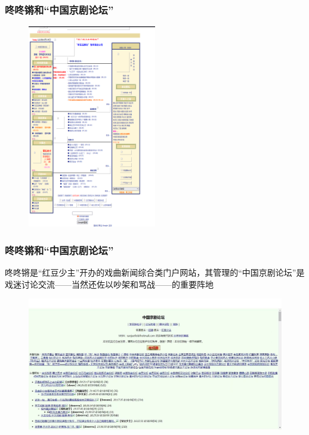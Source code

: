 \documentclass[cjk,slidestop,compress,mathserif,blue]{beamer}
\begin{document}
\frame
{
	\frametitle{咚咚锵和“中国京剧论坛”}
\begin{figure}[h!]
\centering
\vspace{-0.2in}
\includegraphics[height=0.8\textwidth,width=0.5\textwidth,clip]{Figures_Peking-Opera/PekOpe_Dongdongqiang.png}
\label{ChnOpe-1}
\end{figure}
}

\frame
{
	\frametitle{咚咚锵和“中国京剧论坛”}
	咚咚锵是“红豆少主”开办的戏曲新闻综合类门户网站，其管理的“中国京剧论坛”是戏迷讨论交流——当然还佐以吵架和骂战——的重要阵地
\begin{figure}[h!]
\centering
\vspace{-0.15in}
\includegraphics[height=0.55\textwidth,width=1.00\textwidth,clip]{Figures_Peking-Opera/PekOpe_ChnOpe.jpg}
\label{ChnOpe-2}
\end{figure}
}
\end{document}
